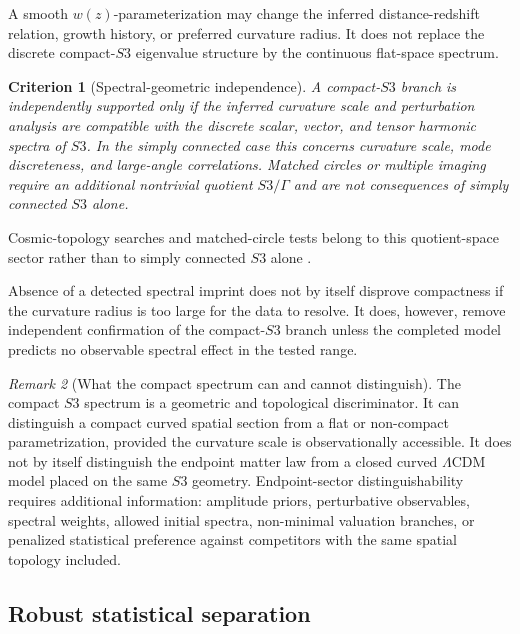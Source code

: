 \documentclass[11pt,a4paper]{article}
\def\Sthree{S3}%
\numberwithin{equation}{section}
\newtheorem{criterion}{Criterion}
\theoremstyle{remark}
\newtheorem{remark}[criterion]{Remark}
\newcommand{\Sthree}{S^3}
\begin{document}
A smooth \(w(z)\)-parameterization may change the inferred distance-redshift relation, growth history, or preferred curvature radius. It does not replace the discrete compact-\(\Sthree\) eigenvalue structure by the continuous flat-space spectrum.

\begin{criterion}[Spectral-geometric independence]
A compact-\(\Sthree\) branch is independently supported only if the inferred curvature scale and perturbation analysis are compatible with the discrete scalar, vector, and tensor harmonic spectra of \(\Sthree\). In the simply connected case this concerns curvature scale, mode discreteness, and large-angle correlations. Matched circles or multiple imaging require an additional nontrivial quotient \(\Sthree/\Gamma\) and are not consequences of simply connected \(\Sthree\) alone.
\end{criterion}

Cosmic-topology searches and matched-circle tests belong to this quotient-space sector rather than to simply connected \(\Sthree\) alone \cite{CornishSpergelStarkman1998,LuminetEtAl2003,Planck2016Topology}.

Absence of a detected spectral imprint does not by itself disprove compactness if the curvature radius is too large for the data to resolve. It does, however, remove independent confirmation of the compact-\(\Sthree\) branch unless the completed model predicts no observable spectral effect in the tested range.

\begin{remark}[What the compact spectrum can and cannot distinguish]
The compact \(\Sthree\) spectrum is a geometric and topological discriminator. It can distinguish a compact curved spatial section from a flat or non-compact parametrization, provided the curvature scale is observationally accessible. It does not by itself distinguish the endpoint matter law from a closed curved \(\Lambda\)CDM model placed on the same \(\Sthree\) geometry. Endpoint-sector distinguishability requires additional information: amplitude priors, perturbative observables, spectral weights, allowed initial spectra, non-minimal valuation branches, or penalized statistical preference against competitors with the same spatial topology included.
\end{remark}

\subsection{Robust statistical separation}
\end{document}
